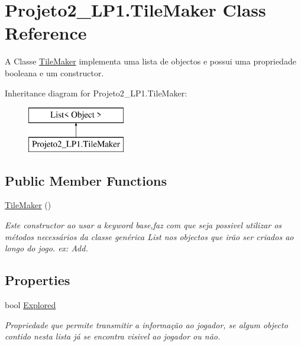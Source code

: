 \hypertarget{class_projeto2___l_p1_1_1_tile_maker}{}\section{Projeto2\+\_\+\+L\+P1.\+Tile\+Maker Class Reference}
\label{class_projeto2___l_p1_1_1_tile_maker}


A Classe \mbox{\hyperlink{class_projeto2___l_p1_1_1_tile_maker}{Tile\+Maker}} implementa uma lista de objectos e possui uma propriedade booleana e um constructor.  


Inheritance diagram for Projeto2\+\_\+\+L\+P1.\+Tile\+Maker\+:\begin{figure}[H]
\begin{center}
\leavevmode
\includegraphics[height=2.000000cm]{class_projeto2___l_p1_1_1_tile_maker}
\end{center}
\end{figure}
\subsection*{Public Member Functions}
\begin{DoxyCompactItemize}
\item 
\mbox{\hyperlink{class_projeto2___l_p1_1_1_tile_maker_af3a223b333dda1fdea8379c8893cef03}{Tile\+Maker}} ()
\begin{DoxyCompactList}\small\item\em Este constructor ao usar a keyword base,faz com que seja possivel utilizar os métodos necessários da classe genérica List nos objectos que irão ser criados ao longo do jogo. ex\+: Add. \end{DoxyCompactList}\end{DoxyCompactItemize}
\subsection*{Properties}
\begin{DoxyCompactItemize}
\item 
bool \mbox{\hyperlink{class_projeto2___l_p1_1_1_tile_maker_a9730098dc5d820a5f8e6cebb2cbce4c4}{Explored}}
\begin{DoxyCompactList}\small\item\em Propriedade que permite transmitir a informação ao jogador, se algum objecto contido nesta lista já se encontra visivel ao jogador ou não. \end{DoxyCompactList}\end{DoxyCompactItemize}


